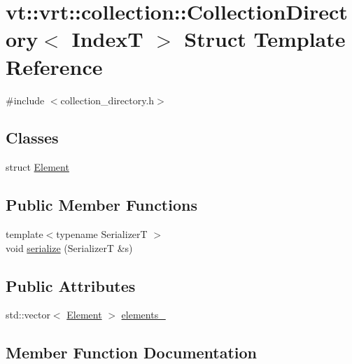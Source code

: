 \hypertarget{structvt_1_1vrt_1_1collection_1_1_collection_directory}{}\section{vt\+:\+:vrt\+:\+:collection\+:\+:Collection\+Directory$<$ IndexT $>$ Struct Template Reference}
\label{structvt_1_1vrt_1_1collection_1_1_collection_directory}


{\ttfamily \#include $<$collection\+\_\+directory.\+h$>$}

\subsection*{Classes}
\begin{DoxyCompactItemize}
\item 
struct \hyperlink{structvt_1_1vrt_1_1collection_1_1_collection_directory_1_1_element}{Element}
\end{DoxyCompactItemize}
\subsection*{Public Member Functions}
\begin{DoxyCompactItemize}
\item 
{\footnotesize template$<$typename SerializerT $>$ }\\void \hyperlink{structvt_1_1vrt_1_1collection_1_1_collection_directory_ac1bf905eb2f877598cbf2b6f7035a402}{serialize} (SerializerT \&s)
\end{DoxyCompactItemize}
\subsection*{Public Attributes}
\begin{DoxyCompactItemize}
\item 
std\+::vector$<$ \hyperlink{structvt_1_1vrt_1_1collection_1_1_collection_directory_1_1_element}{Element} $>$ \hyperlink{structvt_1_1vrt_1_1collection_1_1_collection_directory_abd9de4d084eb8cf4206c4729af70f734}{elements\+\_\+}
\end{DoxyCompactItemize}


\subsection{Member Function Documentation}
\mbox{\label{structvt_1_1vrt_1_1collection_1_1_collection_directory_ac1bf905eb2f877598cbf2b6f7035a402}} 
